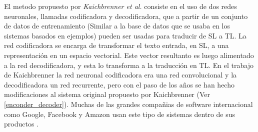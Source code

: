 \documentclass[12pt, letterpaper]{article}
\begin{document}
\begin{multicols}{2}
                El metodo propuesto por \textit{Kaichbrenner et al.} consiste en el uso de dos redes neuronales, llamadas codificadora y decodificadora, que a partir 
                de un conjunto de datos de entrenamiento (Similar a la base de datos que se usaba en los sistemas basados en ejemplos) pueden ser usadas para traducir 
                de SL a TL. La red codificadora se encarga de transformar el texto entrada, en SL, a una representación en un espacio vectorial. Este vector resultanto 
                es luego alimentado a la red decodificadora, y esta lo transforma a la traducción en TL. En el trabajo de Kaichbrenner la red neuronal codificadora era una
                red convolucional y la decodificadora un red recurrente, pero con el paso de los años se han hecho modificaciones al sistema original propuesto por
                Kaichbrenner \cite{Cho} \cite{Sutskever} (Ver \ref{enconder_decoder}). Muchas de las grandes compañias de software internacional como Google, Facebook y
                Amazon usan este tipo de sistemas dentro de sus productos .

                
            
            
    \end{multicols}
    
\end{document}
